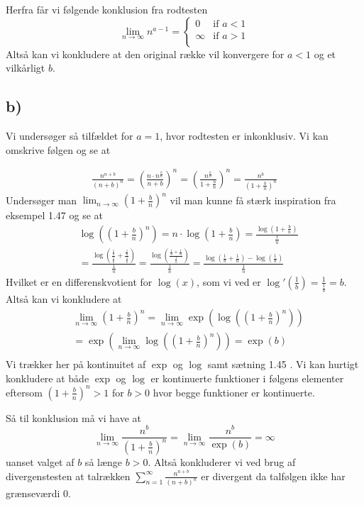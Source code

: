 \documentclass{article}
\newcommand{\lr}[1]{\left( #1\right)}
\begin{document}
Herfra får vi følgende konklusion fra rodtesten
\[
    \lim_{n \to \infty} n^{a-1} = 
    \begin{cases}
    0 & \text{if } a < 1 \\
    \infty & \text{if } a > 1 \\
    \end{cases}
\]
Altså kan vi konkludere at den original række
vil konvergere for $a < 1$ og et vilkårligt $b$.
\subsection*{b)}
Vi undersøger så tilfældet for $a = 1$, hvor rodtesten er inkonklusiv.
Vi kan omskrive følgen og se at

\begin{align*}
\frac{n^{n+b}}{(n+b)^n} 
=\lr{\frac{n \cdot n^{\frac{b}{n}}}{n+b}}^n
=\lr{\frac{n^{\frac{b}{n}}}{1+\frac{b}{n}}}^n
=\frac{n^b}{\lr{1+\frac{b}{n}}^n}
\end{align*}
Undersøger man $\lim_{n \to \infty} (1+ \frac{b}{n})^n$ vil man kunne få stærk inspiration fra eksempel 1.47 \cite{an1}
og se at 
\begin{align*}
    &\log\lr{(1+ \frac{b}{n})^n}
    = n \cdot \log(1+ \frac{b}{n}) 
    = \frac{\log(1+ \frac{b}{n})}{\frac{1}{n}} \\
    &= \frac{\log\lr{\frac{\frac{1}{b}}{\frac{1}{b}} + \frac{\frac{1}{n}}{\frac{1}{b}}}}{\frac{1}{n}}
    = \frac{\log\lr{\frac{\frac{1}{b} + \frac{1}{n}}{\frac{1}{b}}}}{\frac{1}{n}}
    = \frac{\log\lr{\frac{1}{b} + \frac{1}{n}} - \log \lr{\frac{1}{b}}}{\frac{1}{n}}
\end{align*}
Hvilket er en differenskvotient for $\log(x)$, som vi ved er $\log'(\frac{1}{b}) = \frac{1}{\frac{1}{b}} = b$.
Altså kan vi konkludere at 
\begin{align*}
&\lim_{n \to \infty} (1+ \frac{b}{n})^n
=\lim_{n \to \infty} \exp \lr{\log \lr{(1+ \frac{b}{n})^n}}  \\
&=\exp \lr{\lim_{n \to \infty} \log \lr{(1+ \frac{b}{n})^n}} 
=\exp \lr{b}  \\
\end{align*}
Vi trækker her på kontinuitet af $\exp$ og $\log$ samt sætning 1.45 \cite{an1}. 
Vi kan hurtigt konkludere at både $\exp$ og $\log$ er kontinuerte funktioner i følgens elementer
eftersom $(1+\frac{b}{n})^n > 1$ for $b>0$ hvor begge funktioner er kontinuerte.

Så til konklusion må vi have at 
\[
    \lim_{n \to \infty} \frac{n^b}{\lr{1+\frac{b}{n}}^n} 
    = \lim_{n \to \infty} \frac{n^b}{\exp(b)} = \infty
\]
uanset valget af $b$ så længe $b>0$. Altså konkluderer vi ved brug af 
divergenstesten \cite[sætning 2.2]{an1} at talrækken $\sum_{n=1}^\infty \frac{n^{n+b}}{(n+b)^n}$ 
er divergent da talfølgen ikke har grænseværdi $0$.
\end{document}
